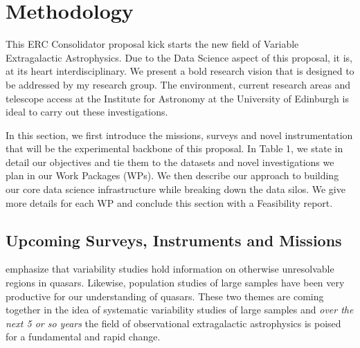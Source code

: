 \section{Methodology}
\noindent
This ERC Consolidator proposal kick starts the new field of Variable
Extragalactic Astrophysics. Due to the Data Science aspect of this
proposal, it is, at its heart interdisciplinary.  We present a bold
research vision that is designed to be addressed by my research
group. The environment, current research areas and telescope access at
the Institute for Astronomy at the University of Edinburgh is ideal to
carry out these investigations.


\smallskip
\smallskip
\noindent
In this section, we first introduce the missions, surveys and novel
instrumentation that will be the experimental backbone of this
proposal. In Table 1, we state in detail our objectives and tie
them to the datasets and novel investigations we plan in our Work Packages
(WPs).  We then describe our approach to building our core data
science infrastructure while breaking down the data silos. We give more
details for each WP and conclude this section with a Feasibility
report.


\subsection{Upcoming Surveys, Instruments and Missions}
\noindent
\citet{Lawrence2016_ASPC} emphasize that variability studies hold
information on otherwise unresolvable regions in quasars. Likewise,
population studies of large samples have been very productive
for our understanding of quasars. These two themes are coming together
in the idea of systematic variability studies of large samples and
{\it over the next 5 or so years} the field of observational
extragalactic astrophysics is poised for a fundamental and rapid
change.

